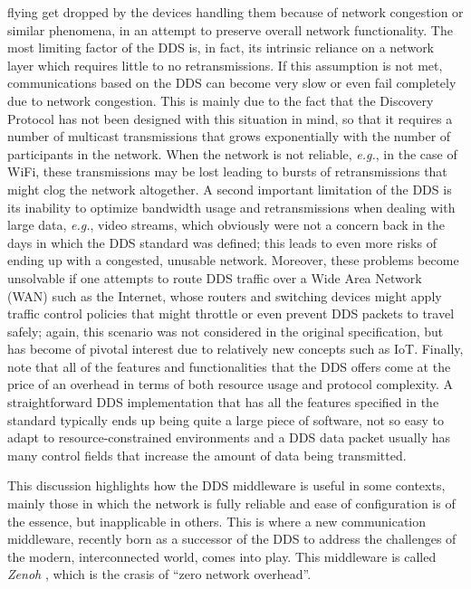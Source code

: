 flying get dropped by the devices handling them because of network congestion or similar phenomena, in an attempt to preserve overall network functionality. The most limiting factor of the DDS is, in fact, its intrinsic reliance on a network layer which requires little to no retransmissions. If this assumption is not met, communications based on the DDS can become very slow or even fail completely due to network congestion. This is mainly due to the fact that the Discovery Protocol has not been designed with this situation in mind, so that it requires a number of multicast transmissions that grows exponentially with the number of participants in the network. When the network is not reliable, \emph{e.g.}, in the case of WiFi, these transmissions may be lost leading to bursts of retransmissions that might clog the network altogether. A second important limitation of the DDS is its inability to optimize bandwidth usage and retransmissions when dealing with large data, \emph{e.g.}, video streams, which obviously were not a concern back in the days in which the DDS standard was defined; this leads to even more risks of ending up with a congested, unusable network. Moreover, these problems become unsolvable if one attempts to route DDS traffic over a Wide Area Network (WAN) such as the Internet, whose routers and switching devices might apply traffic control policies that might throttle or even prevent DDS packets to travel safely; again, this scenario was not considered in the original specification, but has become of pivotal interest due to relatively new concepts such as IoT. Finally, note that all of the features and functionalities that the DDS offers come at the price of an overhead in terms of both resource usage and protocol complexity. A straightforward DDS implementation that has all the features specified in the standard typically ends up being quite a large piece of software, not so easy to adapt to resource-constrained environments and a DDS data packet usually has many control fields that increase the amount of data being transmitted.

This discussion highlights how the DDS middleware is useful in some contexts, mainly those in which the network is fully reliable and ease of configuration is of the essence, but inapplicable in others. This is where a new communication middleware, recently born as a successor of the DDS to address the challenges of the modern, interconnected world, comes into play. This middleware is called \emph{Zenoh} \cite{corsaro_zenoh_2023}, which is the crasis of ``zero network overhead''.

